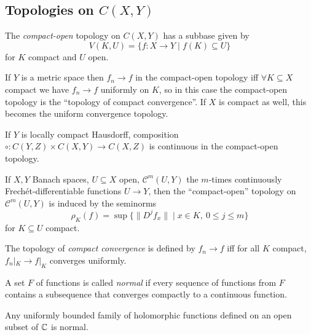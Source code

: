 \documentclass[letterpaper,11pt]{report}
\begin{document}
\subsection{Topologies on $C(X,Y)$}

\begin{defn} The \emph{compact-open} topology on $C(X,Y)$ has a subbase given by
\[
V(K,U) = \{f:X\rightarrow Y \mid f(K) \subseteq U\}
\]
for $K$ compact and $U$ open.
\end{defn}

\begin{prop} If $Y$ is a metric space then $f_n \rightarrow f$ in the compact-open topology iff $\forall K \subseteq X$ compact we have $f_n \rightarrow f$ uniformly on $K$, so in this case the compact-open topology is the ``topology of compact convergence''. If $X$ is compact as well, this becomes the uniform convergence topology.
\end{prop}

\begin{prop} If $Y$ is locally compact Hausdorff, composition $\circ : C(Y,Z) \times C(X,Y) \rightarrow C(X,Z)$ is continuous in the compact-open topology.
\end{prop}

\begin{defn} If $X,Y$ Banach spaces, $U\subseteq X$ open, $\mathcal{C}^m(U,Y)$ the $m$-times continuously Frech\'et-differentiable functions $U \rightarrow Y$, then the ``compact-open'' topology on $\mathcal{C}^m(U,Y)$ is induced by the seminorms
\[
\rho_K(f) = \sup\{\|D^jf_x\| \mid x \in K,\ 0 \le j \le m\}
\]
for $K \subseteq U$ compact.
\end{defn}

\begin{defn} The topology of \emph{compact convergence} is defined by $f_n \rightarrow f$ iff for all $K$ compact, $f_n|_K \rightarrow f|_K$ converges uniformly.
\end{defn}

\begin{prop} A set $F$ of functions is called \emph{normal} if every sequence of functions from $F$ contains a subsequence that converges compactly to a continuous function.
\end{prop}

\begin{thm}[Montel] Any uniformly bounded family of holomorphic functions defined on an open subset of $\mathbb{C}$ is normal.
\end{thm}
\end{document}
